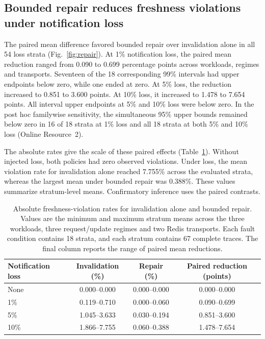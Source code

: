 \documentclass[pdflatex,sn-mathphys-num]{sn-jnl}
\begin{document}
\subsection{Bounded repair reduces freshness violations under notification loss}\label{bounded-repair-reduces-freshness-violations-under-notification-loss}

The paired mean difference favored bounded repair over invalidation alone in all 54 loss strata (Fig.~\ref{fig:repair}). At 1\% notification loss, the paired mean reduction ranged from 0.090 to 0.699 percentage points across workloads, regimes and transports. Seventeen of the 18 corresponding 99\% intervals had upper endpoints below zero, while one ended at zero. At 5\% loss, the reduction increased to 0.851 to 3.600 points. At 10\% loss, it increased to 1.478 to 7.654 points. All interval upper endpoints at 5\% and 10\% loss were below zero. In the post hoc familywise sensitivity, the simultaneous 95\% upper bounds remained below zero in 16 of 18 strata at 1\% loss and all 18 strata at both 5\% and 10\% loss (Online Resource~2).

The absolute rates give the scale of these paired effects (Table~\ref{tab:absolute-freshness}). Without injected loss, both policies had zero observed violations. Under loss, the mean violation rate for invalidation alone reached 7.755\% across the evaluated strata, whereas the largest mean under bounded repair was 0.388\%. These values summarize stratum-level means. Confirmatory inference uses the paired contrasts.

\FloatBarrier
\begin{table}[!htbp]
\caption{Absolute freshness-violation rates for invalidation alone and bounded repair. Values are the minimum and maximum stratum means across the three workloads, three request/update regimes and two Redis transports. Each fault condition contains 18 strata, and each stratum contains 67 complete traces. The final column reports the range of paired mean reductions.}\label{tab:absolute-freshness}
\centering
\small
\begin{tabular}{@{}lccc@{}}
\toprule
Notification loss & Invalidation (\%) & Repair (\%) & Paired reduction (points) \\
\midrule
None  & 0.000--0.000 & 0.000--0.000 & 0.000--0.000 \\
1\%   & 0.119--0.710 & 0.000--0.060 & 0.090--0.699 \\
5\%   & 1.045--3.633 & 0.030--0.194 & 0.851--3.600 \\
10\%  & 1.866--7.755 & 0.060--0.388 & 1.478--7.654 \\
\bottomrule
\end{tabular}
\end{table}
\FloatBarrier
\end{document}
